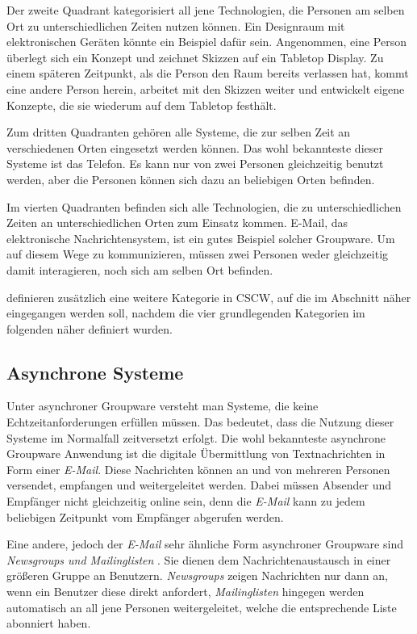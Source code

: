 Der zweite Quadrant kategorisiert all jene Technologien, die Personen am selben Ort zu unterschiedlichen Zeiten nutzen können. Ein Designraum mit elektronischen Geräten könnte ein Beispiel dafür sein. Angenommen, eine Person überlegt sich ein Konzept und zeichnet Skizzen auf ein Tabletop Display. Zu einem späteren Zeitpunkt, als die Person den Raum bereits verlassen hat, kommt eine andere Person herein, arbeitet mit den Skizzen weiter und entwickelt eigene Konzepte, die sie wiederum auf dem Tabletop festhält. 

Zum dritten Quadranten gehören alle Systeme, die zur selben Zeit an verschiedenen Orten eingesetzt werden können. Das wohl bekannteste dieser Systeme ist das Telefon. Es kann nur von zwei Personen gleichzeitig benutzt werden, aber die Personen können sich dazu an beliebigen Orten befinden.

Im vierten Quadranten befinden sich alle Technologien, die zu unterschiedlichen Zeiten an unterschiedlichen Orten zum Einsatz kommen. E-Mail, das elektronische Nachrichtensystem, ist ein gutes Beispiel solcher Groupware. Um auf diesem Wege zu kommunizieren, müssen zwei Personen weder gleichzeitig damit interagieren, noch sich am selben Ort befinden. 

\medskip\citeauthor{Gerlicher:2007p241} definieren zusätzlich eine weitere Kategorie in \ac{CSCW}, auf die im Abschnitt  näher eingegangen werden soll, nachdem die vier grundlegenden Kategorien im folgenden näher definiert wurden.

\subsection{Asynchrone Systeme}

Unter asynchroner Groupware versteht man Systeme, die keine Echtzeitanforderungen erfüllen müssen. Das bedeutet, dass die Nutzung dieser Systeme im Normalfall zeitversetzt erfolgt. Die wohl bekannteste asynchrone Groupware Anwendung ist die digitale Übermittlung von Textnachrichten in Form einer \emph{E-Mail}. Diese Nachrichten können an und von mehreren Personen versendet, empfangen und weitergeleitet werden. Dabei müssen Absender und Empfänger nicht gleichzeitig online sein, denn die \emph{E-Mail} kann zu jedem beliebigen Zeitpunkt vom Empfänger abgerufen werden.

Eine andere, jedoch der \emph{E-Mail} sehr ähnliche Form asynchroner Groupware sind \emph{Newsgroups und Mailinglisten} \citep{Gerlicher:2007p241}. Sie dienen dem Nachrichtenaustausch in einer größeren Gruppe an Benutzern. \emph{Newsgroups} zeigen Nachrichten nur dann an, wenn ein Benutzer diese direkt anfordert, \emph{Mailinglisten} hingegen werden automatisch an all jene Personen weitergeleitet, welche die entsprechende Liste abonniert haben.


